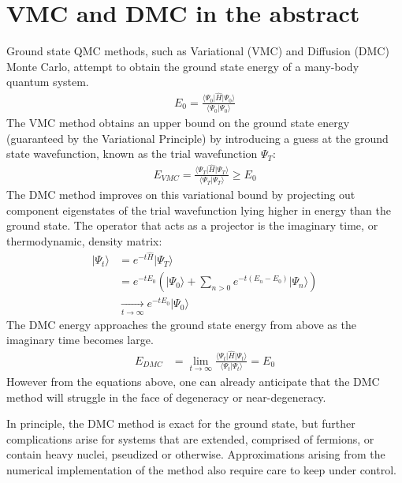 \documentclass[oneside,11pt]{memoir}
\numberwithin{equation}{section}
\newcommand{\ket}[1]{\lvert #1 \rangle}
\newcommand{\bra}[1]{\langle #1 \rvert}
\newcommand{\expval}[3]{\bra{#1}\hat{#2}\ket{#3}}
\newcommand{\overlap}[2]{\langle #1 \lvert #2 \rangle}
\begin{document}
\section{VMC and DMC in the abstract}
Ground state QMC methods, such as Variational (VMC) and Diffusion (DMC) Monte 
Carlo, attempt to obtain the ground state energy of a many-body quantum system.
\begin{align}
  E_0 = \frac{\expval{\Psi_0}{H}{\Psi_0}}{\overlap{\Psi_0}{\Psi_0}}
\end{align}
The VMC method obtains an upper bound on the ground state energy (guaranteed 
by the Variational Principle) by introducing a guess at the ground state wavefunction, known as the trial wavefunction $\Psi_T$:
\begin{align}
  E_{VMC} = \frac{\expval{\Psi_T}{H}{\Psi_T}}{\overlap{\Psi_T}{\Psi_T}} \ge E_0
\end{align}
The DMC method improves on this variational bound by projecting out component 
eigenstates of the trial wavefunction lying higher in energy than the ground 
state.  The operator that acts as a projector is the imaginary time, or 
thermodynamic, density matrix:
\begin{align}
  \ket{\Psi_t} & = e^{-t\hat{H}}\ket{\Psi_T} \nonumber \\
               & = e^{-tE_0}\left( \ket{\Psi_0} + \sum_{n>0}e^{-t(E_n-E_0)}\ket{\Psi_n} \right) \nonumber \\
               &\xrightarrow[t\rightarrow\infty]{} e^{-tE_0} \ket{\Psi_0} 
\end{align}
The DMC energy approaches the ground state energy from above as the imaginary 
time becomes large. 
\begin{align}
  E_{DMC}  & = \lim_{t\rightarrow\infty}\frac{\expval{\Psi_t}{H}{\Psi_t}}{\overlap{\Psi_t}{\Psi_t}} = E_0
\end{align}
However from the equations above, one can already anticipate that the DMC 
method will struggle in the face of degeneracy or near-degeneracy.

In principle, the DMC method is exact for the ground state, but further 
complications arise for systems that are extended, comprised of fermions, 
or contain heavy nuclei, pseudized or otherwise.  Approximations arising 
from the numerical implementation of the method also require care to keep 
under control.
\end{document}
